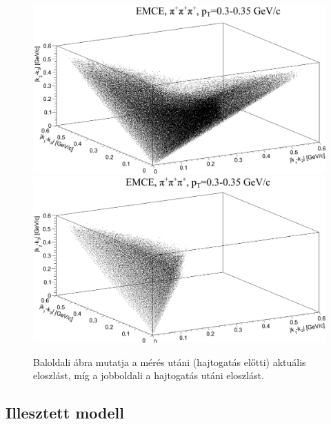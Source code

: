 \documentclass[11pt,a4paper]{article}
\numberwithin{equation}{subsection}
\numberwithin{figure}{section}
\begin{document}
\begin{figure}[H]
\centering
\includegraphics[scale=0.24]{pic/corrfunc/C1}
\includegraphics[scale=0.24]{pic/corrfunc/C2}
\caption{Baloldali ábra mutatja a mérés utáni (hajtogatás előtti) aktuális eloszlást, míg a jobboldali a hajtogatás utáni eloszlást.}
\label{fig:f4}
\end{figure}


\subsection{Illesztett modell}\label{sec:fit}
\end{document}
